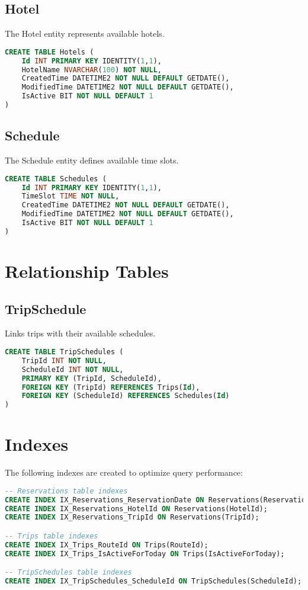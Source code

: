 \subsection{Hotel}
The Hotel entity represents available hotels.

\begin{lstlisting}[language=SQL]
CREATE TABLE Hotels (
    Id INT PRIMARY KEY IDENTITY(1,1),
    HotelName NVARCHAR(100) NOT NULL,
    CreatedTime DATETIME2 NOT NULL DEFAULT GETDATE(),
    ModifiedTime DATETIME2 NOT NULL DEFAULT GETDATE(),
    IsActive BIT NOT NULL DEFAULT 1
)
\end{lstlisting}

\subsection{Schedule}
The Schedule entity defines available time slots.

\begin{lstlisting}[language=SQL]
CREATE TABLE Schedules (
    Id INT PRIMARY KEY IDENTITY(1,1),
    TimeSlot TIME NOT NULL,
    CreatedTime DATETIME2 NOT NULL DEFAULT GETDATE(),
    ModifiedTime DATETIME2 NOT NULL DEFAULT GETDATE(),
    IsActive BIT NOT NULL DEFAULT 1
)
\end{lstlisting}

\section{Relationship Tables}

\subsection{TripSchedule}
Links trips with their available schedules.

\begin{lstlisting}[language=SQL]
CREATE TABLE TripSchedules (
    TripId INT NOT NULL,
    ScheduleId INT NOT NULL,
    PRIMARY KEY (TripId, ScheduleId),
    FOREIGN KEY (TripId) REFERENCES Trips(Id),
    FOREIGN KEY (ScheduleId) REFERENCES Schedules(Id)
)
\end{lstlisting}

\section{Indexes}
The following indexes are created to optimize query performance:

\begin{lstlisting}[language=SQL]
-- Reservations table indexes
CREATE INDEX IX_Reservations_ReservationDate ON Reservations(ReservationDate);
CREATE INDEX IX_Reservations_HotelId ON Reservations(HotelId);
CREATE INDEX IX_Reservations_TripId ON Reservations(TripId);

-- Trips table indexes
CREATE INDEX IX_Trips_RouteId ON Trips(RouteId);
CREATE INDEX IX_Trips_IsActiveForToday ON Trips(IsActiveForToday);

-- TripSchedules table indexes
CREATE INDEX IX_TripSchedules_ScheduleId ON TripSchedules(ScheduleId);
\end{lstlisting}

